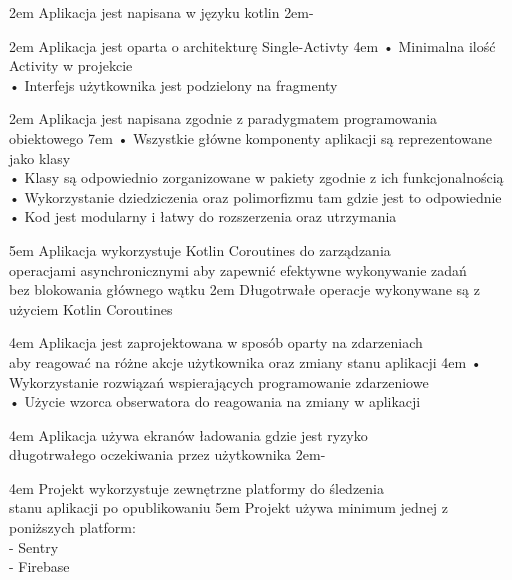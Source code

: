 {2em}{
    Aplikacja jest napisana w języku kotlin
}
{2em}{-}

{2em}{
    Aplikacja jest oparta o architekturę Single-Activty
}
{4em}{
    • Minimalna ilość Activity w projekcie\\
    • Interfejs użytkownika jest podzielony na fragmenty
}

{2em}{
    Aplikacja jest napisana zgodnie z paradygmatem programowania obiektowego
}
{7em}{
    • Wszystkie główne komponenty aplikacji są reprezentowane jako klasy\\
    • Klasy są odpowiednio zorganizowane w pakiety zgodnie z ich funkcjonalnością\\
    • Wykorzystanie dziedziczenia oraz polimorfizmu tam gdzie jest to odpowiednie\\
    • Kod jest modularny i łatwy do rozszerzenia oraz utrzymania
}

{5em}{
    Aplikacja wykorzystuje Kotlin Coroutines do zarządzania\\
    operacjami asynchronicznymi aby zapewnić efektywne wykonywanie zadań\\
    bez blokowania głównego wątku
}
{2em}{
    Długotrwałe operacje wykonywane są z użyciem Kotlin Coroutines
}

{4em}{
    Aplikacja jest zaprojektowana w sposób oparty na zdarzeniach\\
    aby reagować na różne akcje użytkownika oraz zmiany stanu aplikacji
}
{4em}{
    • Wykorzystanie rozwiązań wspierających programowanie zdarzeniowe\\
    • Użycie wzorca obserwatora do reagowania na zmiany w aplikacji
}

{4em}{
    Aplikacja używa ekranów ładowania gdzie jest ryzyko\\
    długotrwałego oczekiwania przez użytkownika
}
{2em}{-}

{4em}{
    Projekt wykorzystuje zewnętrzne platformy do śledzenia\\
    stanu aplikacji po opublikowaniu
}
{5em}{
    Projekt używa minimum jednej z poniższych platform:\\
    - Sentry\\
    - Firebase
}

